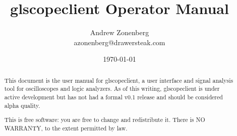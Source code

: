 \documentclass[11pt]{article}
\begin{document}
\title{glscopeclient Operator Manual}
\author{Andrew Zonenberg\\
azonenberg@drawersteak.com}
\date{\today}

\maketitle
\begin{abstract} \normalsize
This document is the user manual for glscopeclient, a user interface and signal analysis tool for oscilloscopes and
logic analyzers. As of this writing, glscopeclient is under active development but has not had a formal v0.1 release
and should be considered alpha quality.

This is free software: you are free to change and redistribute it.
There is NO WARRANTY, to the extent permitted by law.
\end{abstract}
\thispagestyle{empty}

\pagebreak

\tableofcontents

\pagebreak


\pagebreak


\pagebreak


\pagebreak


\pagebreak


\pagebreak


\FloatBarrier
\pagebreak


\pagebreak


\pagebreak


\pagebreak


\pagebreak


\pagebreak

\end{document}
